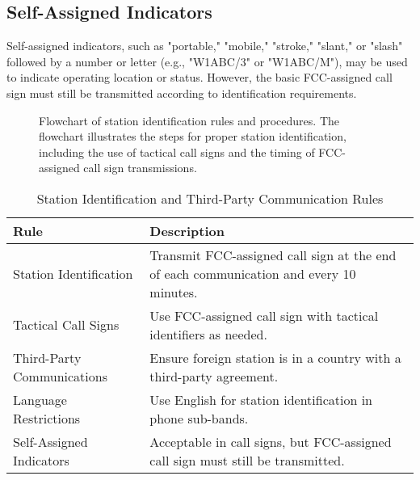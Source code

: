 \subsection*{Self-Assigned Indicators}
Self-assigned indicators, such as "portable," "mobile," "stroke," "slant," or "slash" followed by a number or letter (e.g., "W1ABC/3" or "W1ABC/M"), may be used to indicate operating location or status. However, the basic FCC-assigned call sign must still be transmitted according to identification requirements.

\begin{figure}[h]
    \centering
    \caption{Flowchart of station identification rules and procedures. The flowchart illustrates the steps for proper station identification, including the use of tactical call signs and the timing of FCC-assigned call sign transmissions.}
    \label{fig:station_identification}
\end{figure}

\begin{table}[h]
    \centering
    \begin{tabular}{|l|l|}
        \hline
        \textbf{Rule} & \textbf{Description} \\
        \hline
        Station Identification & Transmit FCC-assigned call sign at the end of each communication and every 10 minutes. \\
        Tactical Call Signs & Use FCC-assigned call sign with tactical identifiers as needed. \\
        Third-Party Communications & Ensure foreign station is in a country with a third-party agreement. \\
        Language Restrictions & Use English for station identification in phone sub-bands. \\
        Self-Assigned Indicators & Acceptable in call signs, but FCC-assigned call sign must still be transmitted. \\
        \hline
    \end{tabular}
    \caption{Station Identification and Third-Party Communication Rules}
    \label{tab:station_identification}
\end{table}

